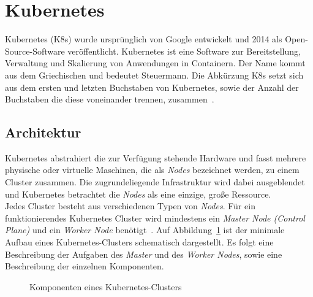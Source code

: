 \section{Kubernetes}\label{sec:kubernetes}

Kubernetes (K8s) wurde ursprünglich von Google entwickelt und 2014 als Open-Source-Software veröffentlicht.
Kubernetes ist eine Software zur Bereitstellung, Verwaltung und Skalierung von Anwendungen in Containern. Der Name kommt aus dem Griechischen und bedeutet Steuermann.
Die Abkürzung K8s setzt sich aus dem ersten und letzten Buchstaben von Kubernetes, sowie der Anzahl der Buchstaben die diese voneinander trennen, zusammen~\cite{kubernetes-google-cloud}.

\subsection{Architektur}

Kubernetes abstrahiert die zur Verfügung stehende Hardware und fasst mehrere physische oder virtuelle Maschinen,
die als \textit{Nodes} bezeichnet werden, zu einem Cluster zusammen.
Die zugrundeliegende Infrastruktur wird dabei ausgeblendet und Kubernetes betrachtet die \textit{Nodes} als eine einzige, große Ressource.
\\
Jedes Cluster besteht aus verschiedenen Typen von \textit{Nodes}.
Für ein funktionierendes Kubernetes Cluster wird mindestens ein \textit{Master Node (Control Plane)} und ein \textit{Worker Node} benötigt~\cite{kubernetes-in-action-introduction}.
Auf Abbildung~\ref{fig:kubernetes-architecture} ist der minimale Aufbau eines Kubernetes-Clusters schematisch dargestellt. Es folgt eine
Beschreibung der Aufgaben des \textit{Master} und des \textit{Worker Nodes}, sowie eine Beschreibung der einzelnen Komponenten.

\begin{figure}[htp] %
    \centering
    \caption{Komponenten eines Kubernetes-Clusters}
    \label{fig:kubernetes-architecture}
\end{figure}

